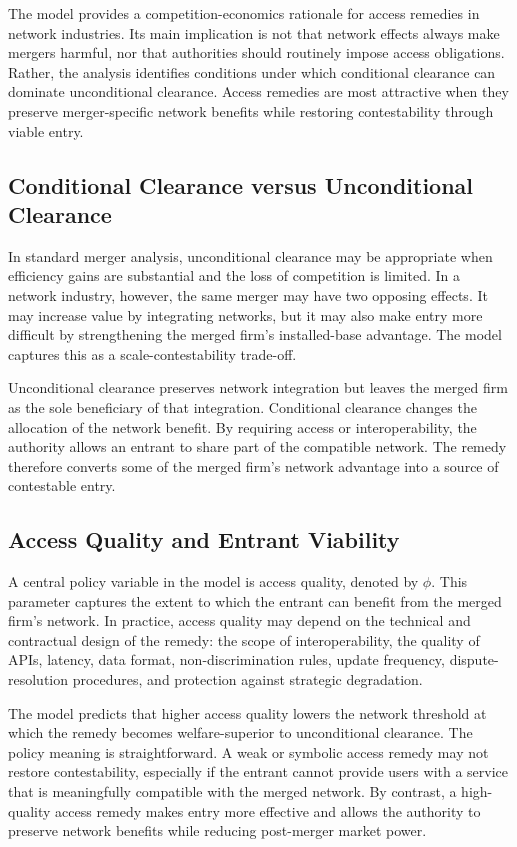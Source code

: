\documentclass[12pt]{article}
\begin{document}
The model provides a competition-economics rationale for access remedies in network industries. Its main implication is not that network effects always make mergers harmful, nor that authorities should routinely impose access obligations. Rather, the analysis identifies conditions under which conditional clearance can dominate unconditional clearance. Access remedies are most attractive when they preserve merger-specific network benefits while restoring contestability through viable entry.

\subsection{Conditional Clearance versus Unconditional Clearance}

In standard merger analysis, unconditional clearance may be appropriate when efficiency gains are substantial and the loss of competition is limited. In a network industry, however, the same merger may have two opposing effects. It may increase value by integrating networks, but it may also make entry more difficult by strengthening the merged firm's installed-base advantage. The model captures this as a scale-contestability trade-off.

Unconditional clearance preserves network integration but leaves the merged firm as the sole beneficiary of that integration. Conditional clearance changes the allocation of the network benefit. By requiring access or interoperability, the authority allows an entrant to share part of the compatible network. The remedy therefore converts some of the merged firm's network advantage into a source of contestable entry.

\subsection{Access Quality and Entrant Viability}

A central policy variable in the model is access quality, denoted by $\phi$. This parameter captures the extent to which the entrant can benefit from the merged firm's network. In practice, access quality may depend on the technical and contractual design of the remedy: the scope of interoperability, the quality of APIs, latency, data format, non-discrimination rules, update frequency, dispute-resolution procedures, and protection against strategic degradation.

The model predicts that higher access quality lowers the network threshold at which the remedy becomes welfare-superior to unconditional clearance. The policy meaning is straightforward. A weak or symbolic access remedy may not restore contestability, especially if the entrant cannot provide users with a service that is meaningfully compatible with the merged network. By contrast, a high-quality access remedy makes entry more effective and allows the authority to preserve network benefits while reducing post-merger market power.
\end{document}
